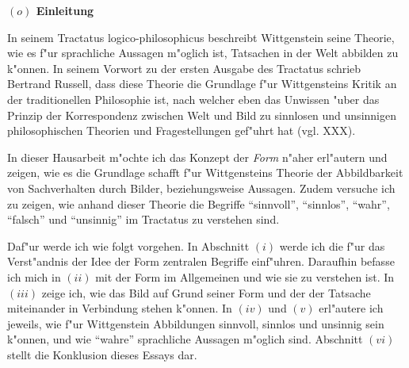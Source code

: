 \documentclass[a4paper, emulatestandardclasses, 12pt]{scrartcl}
\begin{document}
\begin{onehalfspace} 



\noindent\textbf{$(o)$ Einleitung}

\noindent In seinem Tractatus logico-philosophicus \citep{wittgenstein1963tractatus} beschreibt Wittgenstein seine Theorie, wie es f"ur sprachliche Aussagen m"oglich ist, Tatsachen in der Welt abbilden zu k"onnen. In seinem Vorwort zu der ersten Ausgabe des Tractatus schrieb Bertrand Russell, dass diese Theorie die Grundlage f"ur Wittgensteins Kritik an der traditionellen Philosophie ist, nach welcher eben das Unwissen "uber das Prinzip der Korrespondenz zwischen Welt und Bild zu sinnlosen und unsinnigen philosophischen Theorien und Fragestellungen gef"uhrt hat (vgl. XXX).

In dieser Hausarbeit m"ochte ich das Konzept der \emph{Form} n"aher erl"autern und zeigen, wie es die Grundlage schafft f"ur Wittgensteins Theorie der Abbildbarkeit von Sachverhalten durch Bilder, beziehungsweise Aussagen. Zudem versuche ich zu zeigen, wie anhand dieser Theorie die Begriffe "`sinnvoll"', "`sinnlos"', "`wahr"', "`falsch"' und "`unsinnig"' im Tractatus zu verstehen sind.


Daf"ur werde ich wie folgt vorgehen. In Abschnitt $(i)$ werde ich die f"ur das Verst"andnis der Idee der Form zentralen Begriffe einf"uhren. Daraufhin befasse ich mich in $(ii)$ mit der Form im Allgemeinen und wie sie zu verstehen ist. In $(iii)$ zeige ich, wie das Bild auf Grund seiner Form und der der Tatsache miteinander in Verbindung stehen k"onnen. In $(iv)$ und $(v)$ erl"autere ich jeweils, wie f"ur Wittgenstein Abbildungen sinnvoll, sinnlos und unsinnig sein k"onnen, und wie "`wahre"' sprachliche Aussagen m"oglich sind. Abschnitt $(vi)$ stellt die Konklusion dieses Essays dar.
\vspace{5mm}




\end{onehalfspace}
\end{document}
